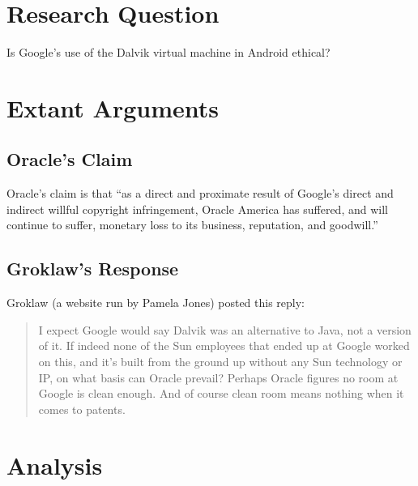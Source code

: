 \documentclass[11pt]{article}
\begin{document}
\begin{multicols}{2}
\section{Research Question} %
Is Google's use of the Dalvik virtual machine in Android ethical?

\section{Extant Arguments} %

\subsection{Oracle's Claim} %

Oracle's claim is that ``as a direct and proximate result of Google’s direct
and indirect willful copyright infringement, Oracle America has suffered, and
will continue to suffer, monetary loss to its business, reputation, and
goodwill.'' \cite[p.~9 line 11]{oracle-lawsuit}

\subsection{Groklaw's Response} %

Groklaw (a website run by Pamela Jones) posted this reply: \cite{groklaw}

\begin{quotation}
I expect Google would say Dalvik was an alternative to Java, not a version of
it. If indeed none of the Sun employees that ended up at Google worked on this,
and it's built from the ground up without any Sun technology or IP, on what
basis can Oracle prevail? Perhaps Oracle figures no room at Google is clean
enough. And of course clean room means nothing when it comes to patents.
\end{quotation}

\section{Analysis} %
\label{sec:analysis}


\end{multicols}
\end{document}
